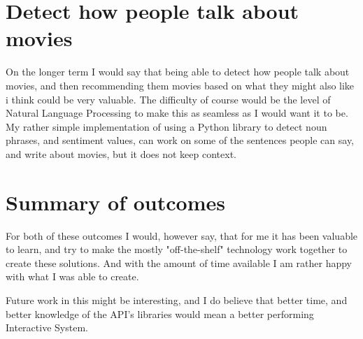\documentclass[11pt,fleqn]{book} %
\begin{document}
\section{Detect how people talk about movies}
On the longer term I would say that being able to detect how people talk about movies, and then recommending them movies based on what they might also like i think could be very valuable. The difficulty of course would be the level of Natural Language Processing\cite{Wikipedia2017NaturalProcessing} to make this as seamless as I would want it to be. 
My rather simple implementation of using a Python library \cite{TextBlobTutorial:Documentation} to detect noun phrases, and sentiment values, can work on some of the sentences people can say, and write about movies, but it does not keep context. 
\section{Summary of outcomes}
For both of these outcomes I would, however say, that for me it has been valuable to learn, and try to make the mostly "off-the-shelf" technology work together to create these solutions. And with the amount of time available I am rather happy with what I was able to create.

Future work in this might be interesting, and I do believe that better time, and better knowledge of the API's libraries would mean a better performing Interactive System.

\printbibliography

\end{document}
